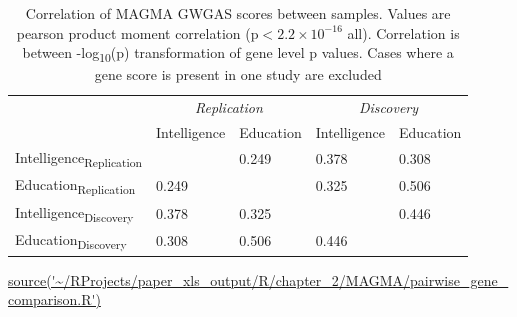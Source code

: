 \begin{table}[]
    \centering
   \setlength{\extrarowheight}{2pt}
    \begin{tabular}{lllll}
    \toprule
      &  \multicolumn{2}{c}{\textit{Replication}} & \multicolumn{2}{c}{\textit{Discovery}} \\
\cmidrule{2-5}
    &  Intelligence  & Education &
    Intelligence & Education \\
    \midrule
     Intelligence\textsubscript{Replication}    & & 0.249 &0.378  & 0.308 \\
     Education\textsubscript{Replication} &0.249 &&0.325&0.506 \\
     Intelligence\textsubscript{Discovery}&0.378 &0.325&&0.446 \\
     Education\textsubscript{Discovery}&0.308&0.506 &0.446 & \\
\bottomrule
    \end{tabular}
    
    \caption[Correlation of MAGMA GWGAS scores between samples]{Correlation of MAGMA GWGAS scores between samples. Values are pearson product moment correlation (p$<2.2\times10^{-16}$ all). Correlation is between -log\textsubscript{10}(p) transformation of gene level p values. Cases where a gene score is present in one study are excluded}
    \tiny\url{source('~/RProjects/paper_xls_output/R/chapter_2/MAGMA/pairwise_gene_comparison.R')}
    \label{tab:correlation of MAGMA GWGAS scores}
\end{table}







